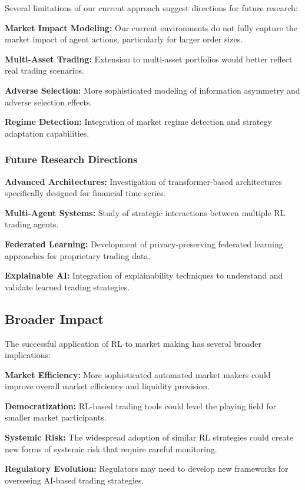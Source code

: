 \documentclass[conference]{IEEEtran}
\begin{document}
Several limitations of our current approach suggest directions for future research:

\textbf{Market Impact Modeling:} Our current environments do not fully capture the market impact of agent actions, particularly for larger order sizes.

\textbf{Multi-Asset Trading:} Extension to multi-asset portfolios would better reflect real trading scenarios.

\textbf{Adverse Selection:} More sophisticated modeling of information asymmetry and adverse selection effects.

\textbf{Regime Detection:} Integration of market regime detection and strategy adaptation capabilities.

\subsubsection{Future Research Directions}

\textbf{Advanced Architectures:} Investigation of transformer-based architectures specifically designed for financial time series.

\textbf{Multi-Agent Systems:} Study of strategic interactions between multiple RL trading agents.

\textbf{Federated Learning:} Development of privacy-preserving federated learning approaches for proprietary trading data.

\textbf{Explainable AI:} Integration of explainability techniques to understand and validate learned trading strategies.

\subsection{Broader Impact}

The successful application of RL to market making has several broader implications:

\textbf{Market Efficiency:} More sophisticated automated market makers could improve overall market efficiency and liquidity provision.

\textbf{Democratization:} RL-based trading tools could level the playing field for smaller market participants.

\textbf{Systemic Risk:} The widespread adoption of similar RL strategies could create new forms of systemic risk that require careful monitoring.

\textbf{Regulatory Evolution:} Regulators may need to develop new frameworks for overseeing AI-based trading strategies.
\end{document}
